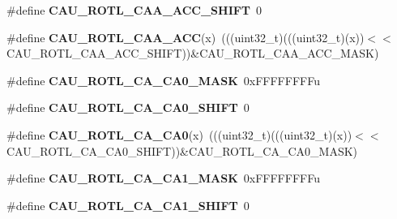 \begin{DoxyCompactItemize}
\item 
\#define {\bfseries C\+A\+U\+\_\+\+R\+O\+T\+L\+\_\+\+C\+A\+A\+\_\+\+A\+C\+C\+\_\+\+S\+H\+I\+FT}~0\hypertarget{group__CAU__Register__Masks_gac36dbf4828c435c589cbcee42b1356d3}{}\label{group__CAU__Register__Masks_gac36dbf4828c435c589cbcee42b1356d3}

\item 
\#define {\bfseries C\+A\+U\+\_\+\+R\+O\+T\+L\+\_\+\+C\+A\+A\+\_\+\+A\+CC}(x)~(((uint32\+\_\+t)(((uint32\+\_\+t)(x))$<$$<$C\+A\+U\+\_\+\+R\+O\+T\+L\+\_\+\+C\+A\+A\+\_\+\+A\+C\+C\+\_\+\+S\+H\+I\+FT))\&C\+A\+U\+\_\+\+R\+O\+T\+L\+\_\+\+C\+A\+A\+\_\+\+A\+C\+C\+\_\+\+M\+A\+SK)\hypertarget{group__CAU__Register__Masks_ga1063642340f6774011d044d0abe0ee8d}{}\label{group__CAU__Register__Masks_ga1063642340f6774011d044d0abe0ee8d}

\item 
\#define {\bfseries C\+A\+U\+\_\+\+R\+O\+T\+L\+\_\+\+C\+A\+\_\+\+C\+A0\+\_\+\+M\+A\+SK}~0x\+F\+F\+F\+F\+F\+F\+F\+Fu\hypertarget{group__CAU__Register__Masks_ga2b86bab9480c6bf6115dad260ab161a3}{}\label{group__CAU__Register__Masks_ga2b86bab9480c6bf6115dad260ab161a3}

\item 
\#define {\bfseries C\+A\+U\+\_\+\+R\+O\+T\+L\+\_\+\+C\+A\+\_\+\+C\+A0\+\_\+\+S\+H\+I\+FT}~0\hypertarget{group__CAU__Register__Masks_ga3181be32a342d2194fc201a642c18878}{}\label{group__CAU__Register__Masks_ga3181be32a342d2194fc201a642c18878}

\item 
\#define {\bfseries C\+A\+U\+\_\+\+R\+O\+T\+L\+\_\+\+C\+A\+\_\+\+C\+A0}(x)~(((uint32\+\_\+t)(((uint32\+\_\+t)(x))$<$$<$C\+A\+U\+\_\+\+R\+O\+T\+L\+\_\+\+C\+A\+\_\+\+C\+A0\+\_\+\+S\+H\+I\+FT))\&C\+A\+U\+\_\+\+R\+O\+T\+L\+\_\+\+C\+A\+\_\+\+C\+A0\+\_\+\+M\+A\+SK)\hypertarget{group__CAU__Register__Masks_ga75587dbec3309dd33c787776321096eb}{}\label{group__CAU__Register__Masks_ga75587dbec3309dd33c787776321096eb}

\item 
\#define {\bfseries C\+A\+U\+\_\+\+R\+O\+T\+L\+\_\+\+C\+A\+\_\+\+C\+A1\+\_\+\+M\+A\+SK}~0x\+F\+F\+F\+F\+F\+F\+F\+Fu\hypertarget{group__CAU__Register__Masks_gabfb4747ca51ec2bf523adf1d27b3a55c}{}\label{group__CAU__Register__Masks_gabfb4747ca51ec2bf523adf1d27b3a55c}

\item 
\#define {\bfseries C\+A\+U\+\_\+\+R\+O\+T\+L\+\_\+\+C\+A\+\_\+\+C\+A1\+\_\+\+S\+H\+I\+FT}~0\hypertarget{group__CAU__Register__Masks_ga7a9ebabc5cddc8cb1d94f2b371b614d2}{}\label{group__CAU__Register__Masks_ga7a9ebabc5cddc8cb1d94f2b371b614d2}


\end{DoxyCompactItemize}
